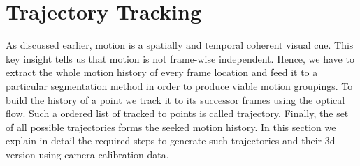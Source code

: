 \section{Trajectory Tracking}
\label{sec:trajectory_tracking}
As discussed earlier, motion is a spatially and temporal coherent visual cue. This key insight tells us that motion is not frame-wise independent. Hence, we have to extract the whole motion history of every frame location and feed it to a particular segmentation method in order to produce viable motion groupings. To build the history of a point we track it to its successor frames using the optical flow. Such a ordered list of tracked to points is called trajectory. Finally, the set of all possible trajectories forms the seeked motion history. In this section we explain in detail the required steps to generate such trajectories and their 3d version using camera calibration data.

